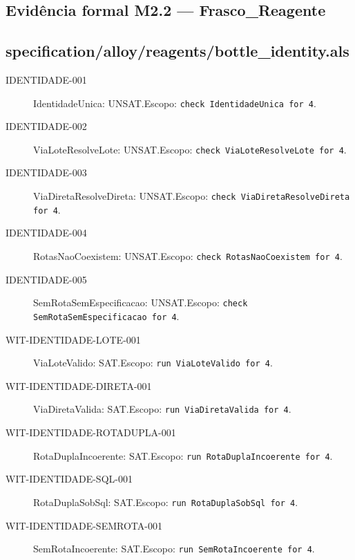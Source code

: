 \subsection*{Evidência formal M2.2 --- Frasco\_Reagente}
\subsection*{specification/alloy/reagents/bottle\_identity.als}
\begin{description}
\item[IDENTIDADE-001] IdentidadeUnica: UNSAT.\newline Escopo: \texttt{check IdentidadeUnica for 4}.
\item[IDENTIDADE-002] ViaLoteResolveLote: UNSAT.\newline Escopo: \texttt{check ViaLoteResolveLote for 4}.
\item[IDENTIDADE-003] ViaDiretaResolveDireta: UNSAT.\newline Escopo: \texttt{check ViaDiretaResolveDireta for 4}.
\item[IDENTIDADE-004] RotasNaoCoexistem: UNSAT.\newline Escopo: \texttt{check RotasNaoCoexistem for 4}.
\item[IDENTIDADE-005] SemRotaSemEspecificacao: UNSAT.\newline Escopo: \texttt{check SemRotaSemEspecificacao for 4}.
\item[WIT-IDENTIDADE-LOTE-001] ViaLoteValido: SAT.\newline Escopo: \texttt{run ViaLoteValido for 4}.
\item[WIT-IDENTIDADE-DIRETA-001] ViaDiretaValida: SAT.\newline Escopo: \texttt{run ViaDiretaValida for 4}.
\item[WIT-IDENTIDADE-ROTADUPLA-001] RotaDuplaIncoerente: SAT.\newline Escopo: \texttt{run RotaDuplaIncoerente for 4}.
\item[WIT-IDENTIDADE-SQL-001] RotaDuplaSobSql: SAT.\newline Escopo: \texttt{run RotaDuplaSobSql for 4}.
\item[WIT-IDENTIDADE-SEMROTA-001] SemRotaIncoerente: SAT.\newline Escopo: \texttt{run SemRotaIncoerente for 4}.
\end{description}
